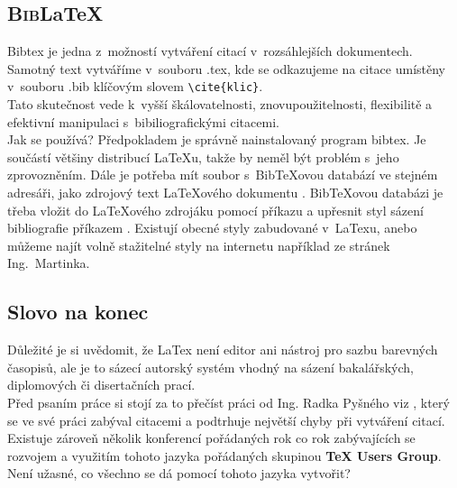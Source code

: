 \documentclass[11pt,a4paper]{article}
\begin{document}
\subsection{\textsc{Bib}\LaTeX}
Bibtex je jedna z~možností vytváření citací v~rozsáhlejších dokumentech. Samotný text vytváříme v~souboru .tex, kde se odkazujeme na citace umístěny v~souboru .bib klíčovým slovem \verb|\cite{klic}|.  \cite{Helmut:GuiToLatex} \\
Tato skutečnost vede k~vyšší škálovatelnosti, znovupoužitelnosti, flexibilitě a efektivní manipulaci s~bibiliografickými citacemi. \cite{Luptak:Bibtex} \\
Jak se používá? Předpokladem je správně nainstalovaný program bibtex. Je součástí většiny distribucí LaTeXu, takže by neměl být problém s~jeho zprovozněním. Dále je potřeba mít soubor s~BibTeXovou databází ve stejném adresáři, jako zdrojový text LaTeXového dokumentu \cite{Martinek:Latex}. BibTeXovou databázi je třeba vložit do LaTeXového zdrojáku pomocí příkazu \verb|| a upřesnit styl sázení bibliografie příkazem \verb||. Existují obecné styly zabudované v~LaTexu, anebo můžeme najít volně stažitelné styly na internetu například ze stránek Ing.~Martinka. 


\subsection{Slovo na konec}
Důležité je si uvědomit, že LaTex není editor ani nástroj pro sazbu barevných časopisů, ale je to sázecí autorský systém vhodný na sázení bakalářských, diplomových či disertačních prací. \cite{FEKT:Latex} \\
Před psaním práce si stojí za to přečíst práci od Ing. Radka Pyšného viz \cite{Pysny:Bibtex}, který se ve své práci zabýval citacemi a podtrhuje největší chyby při vytváření citací.
Existuje zároveň několik konferencí pořádaných rok co rok zabývajících se rozvojem a využitím tohoto jazyka pořádaných skupinou \textbf{TeX Users Group}. Není užasné, co všechno se dá pomocí tohoto jazyka vytvořit? \cite{Sojka:Hyphenation}




\newpage


\end{document}
